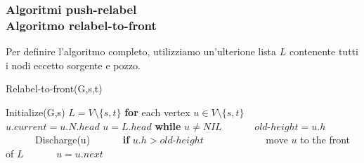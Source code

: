 \documentclass{beamer}
\begin{document}
\begin{frame}
\frametitle{Algoritmi push-relabel\\Algoritmo relabel-to-front}
Per definire l'algoritmo completo, utilizziamo un'ulterione lista $L$ contenente tutti i nodi eccetto sorgente e pozzo.
\begin{algorithm}[H]
    \caption{Relabel-to-front(G,s,t)}%
    \begin{algorithmic}[1]
        \State Initialize(G,s)
        \State $L=V\setminus\{s,t\}$
        \State \textbf{for} each vertex $u\in V\setminus\{s,t\}$
        \State \ \ \ \ \ \ $u.current=u.N.head$
        \State $u=L.head$
        \State \textbf{while} $u\not =NIL$
        \State \ \ \ \ \ \ $old\mbox{-}height=u.h$
        \State \ \ \ \ \ \ Discharge(u)
        \State \ \ \ \ \ \ \textbf{if} $u.h>old\mbox{-}height$
        \State \ \ \ \ \ \ \ \ \ \ \ \ move $u$ to the front of $L$
        \State \ \ \ \ \ \ $u=u.next$
    \end{algorithmic}
    \label{alg_1}
\end{algorithm}
\end{frame}
\end{document}
